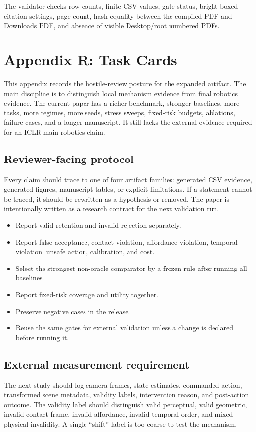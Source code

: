 \documentclass{article}
\begin{document}
The validator checks row counts, finite CSV values, gate status, bright boxed citation settings, page count, hash equality between the compiled PDF and Downloads PDF, and absence of visible Desktop/root numbered PDFs.


\section{Appendix R: Task Cards}
This appendix records the hostile-review posture for the expanded artifact. The main discipline is to distinguish local mechanism evidence from final robotics evidence. The current paper has a richer benchmark, stronger baselines, more tasks, more regimes, more seeds, stress sweeps, fixed-risk budgets, ablations, failure cases, and a longer manuscript. It still lacks the external evidence required for an ICLR-main robotics claim.

\subsection{Reviewer-facing protocol}
Every claim should trace to one of four artifact families: generated CSV evidence, generated figures, manuscript tables, or explicit limitations. If a statement cannot be traced, it should be rewritten as a hypothesis or removed. The paper is intentionally written as a research contract for the next validation run.

\begin{itemize}
\item Report valid retention and invalid rejection separately.
\item Report false acceptance, contact violation, affordance violation, temporal violation, unsafe action, calibration, and cost.
\item Select the strongest non-oracle comparator by a frozen rule after running all baselines.
\item Report fixed-risk coverage and utility together.
\item Preserve negative cases in the release.
\item Reuse the same gates for external validation unless a change is declared before running it.
\end{itemize}

\subsection{External measurement requirement}
The next study should log camera frames, state estimates, commanded action, transformed scene metadata, validity labels, intervention reason, and post-action outcome. The validity label should distinguish valid perceptual, valid geometric, invalid contact-frame, invalid affordance, invalid temporal-order, and mixed physical invalidity. A single ``shift'' label is too coarse to test the mechanism.
\end{document}
